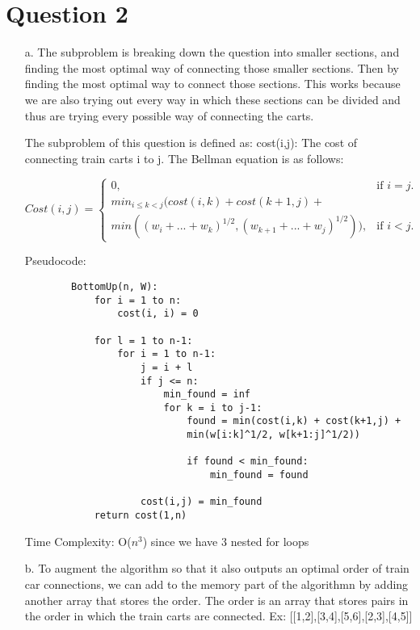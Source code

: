 \documentclass[12pt]{article}
\begin{document}
\section*{Question 2}
\begin{enumerate}
    \item[a.] The subproblem is breaking down the question into smaller sections, and finding the most 
    optimal way of connecting those smaller sections. Then by finding the most optimal way to connect
    those sections. This works because we are also trying out every way in which these sections can be divided
    and thus are trying every possible way of connecting the carts. 
    
    The subproblem of this question is defined as:
    cost(i,j): The cost of connecting train carts i to j. The Bellman equation is as follows:

    \begin{equation}
        Cost(i,j)=\begin{cases}
    0, & \text{if $i=j$}.\\
    min_{i \leq k < j}(cost(i,k) + cost(k+1, j) + \\min((w_{i} + ... + w_{k})^{1/2},(w_{k+1} + ... + w_{j})^{1/2})), & \text{if $i < j$}.
    \end{cases}
    \end{equation}

    Pseudocode:
    \begin{verbatim}
        BottomUp(n, W):
            for i = 1 to n:
                cost(i, i) = 0
            
            for l = 1 to n-1:
                for i = 1 to n-1:
                    j = i + l
                    if j <= n:
                        min_found = inf
                        for k = i to j-1:
                            found = min(cost(i,k) + cost(k+1,j) + 
                            min(w[i:k]^1/2, w[k+1:j]^1/2))

                            if found < min_found:
                                min_found = found

                    cost(i,j) = min_found
            return cost(1,n)
    \end{verbatim}

    Time Complexity: O($n^3$) since we have 3 nested for loops 

    \item[b. ] To augment the algorithm so that it also outputs an optimal order
    of train car connections, we can add to the memory part of the algorithmn by
    adding another array that stores the order. The order is an array that stores
    pairs in the order in which the train carts are connected. 
    Ex: [[1,2],[3,4],[5,6],[2,3],[4,5]] 
    

\end{enumerate}
\end{document}
